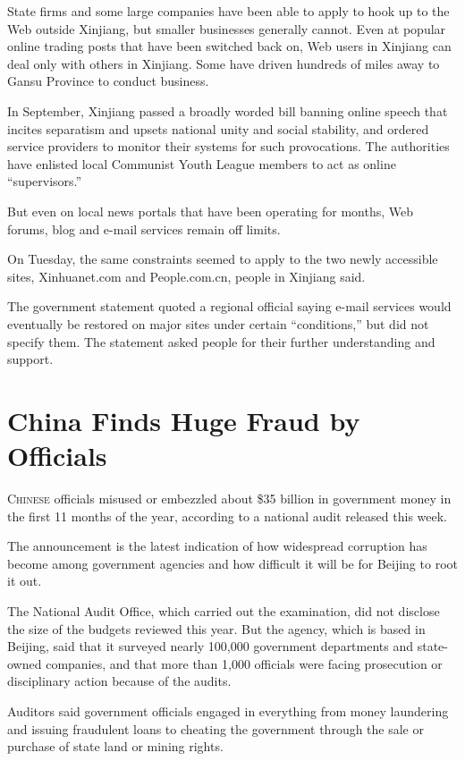 ﻿\documentclass[12pt]{article}
\begin{document}
State firms and some large companies have been able to apply to hook up to the Web outside Xinjiang,
but smaller businesses generally cannot. Even at popular online trading posts that have been
switched back on, Web users in Xinjiang can deal only with others in Xinjiang. Some have driven
hundreds of miles away to Gansu Province to conduct business.

In September, Xinjiang passed a broadly worded bill banning online speech that incites separatism
and upsets national unity and social stability, and ordered service providers to monitor their
systems for such provocations. The authorities have enlisted local Communist Youth League members to
act as online ``supervisors.''

But even on local news portals that have been operating for months, Web forums, blog and e-mail
services remain off limits.

On Tuesday, the same constraints seemed to apply to the two newly accessible sites, Xinhuanet.com
and People.com.cn, people in Xinjiang said.

The government statement quoted a regional official saying e-mail services would eventually be
restored on major sites under certain ``conditions,'' but did not specify them. The statement asked
people for their further understanding and support.

\section{China Finds Huge Fraud by Officials}

\lettrine{C}{hinese} officials misused or embezzled about \$35 billion in
government money in the first 11 months of the year, according to a national audit released this
week.

The announcement is the latest indication of how widespread corruption has become among government
agencies and how difficult it will be for Beijing to root it out.

The National Audit Office, which carried out the examination, did not disclose the size of the
budgets reviewed this year. But the agency, which is based in Beijing, said that it surveyed nearly
100,000 government departments and state-owned companies, and that more than 1,000 officials were
facing prosecution or disciplinary action because of the audits.

Auditors said government officials engaged in everything from money laundering and issuing
fraudulent loans to cheating the government through the sale or purchase of state land or mining
rights.
\end{document}
